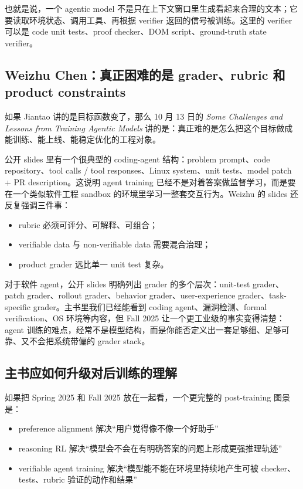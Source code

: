 也就是说，一个 agentic model 不是只在上下文窗口里生成看起来合理的文本；它要读取环境状态、调用工具、再根据 verifier 返回的信号被训练。这里的 verifier 可以是 code unit tests、proof checker、DOM script、ground-truth state verifier。

\subsection{Weizhu Chen：真正困难的是 grader、rubric 和 product constraints}

如果 Jiantao 讲的是目标函数变了，那么 10 月 13 日的 \emph{Some Challenges and Lessons from Training Agentic Models} 讲的是：真正难的是怎么把这个目标做成能训练、能上线、能稳定优化的工程对象。

公开 slides 里有一个很典型的 coding-agent 结构：problem prompt、code repository、tool calls / tool responses、Linux system、unit tests、model patch + PR description。这说明 agent training 已经不是对着答案做监督学习，而是要在一个类似软件工程 sandbox 的环境里学习一整套交互行为。Weizhu 的 slides 还反复强调三件事：

\begin{itemize}
\item rubric 必须可评分、可解释、可组合；
\item verifiable data 与 non-verifiable data 需要混合治理；
\item product grader 远比单一 unit test 复杂。
\end{itemize}

对于软件 agent，公开 slides 明确列出 grader 的多个层次：unit-test grader、patch grader、rollout grader、behavior grader、user-experience grader、task-specific grader。主书里我们已经能看到 coding agent、漏洞检测、formal verification、OS 环境等内容，但 Fall 2025 让一个更工业级的事实变得清楚：agent 训练的难点，经常不是模型结构，而是你能否定义出一套足够细、足够可靠、又不会把系统带偏的 grader stack。

\subsection{主书应如何升级对后训练的理解}

如果把 Spring 2025 和 Fall 2025 放在一起看，一个更完整的 post-training 图景是：

\begin{itemize}
\item preference alignment 解决“用户觉得像不像一个好助手”
\item reasoning RL 解决“模型会不会在有明确答案的问题上形成更强推理轨迹”
\item verifiable agent training 解决“模型能不能在环境里持续地产生可被 checker、tests、rubric 验证的动作和结果”
\end{itemize}


